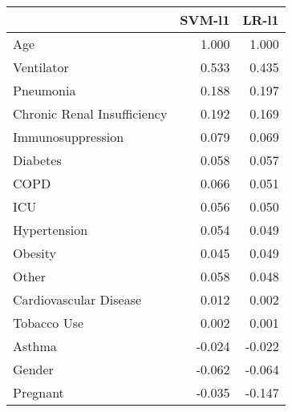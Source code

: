 \begin{tabular}{lrr}
\toprule
{} &  SVM-l1 &  LR-l1 \\
\midrule
Age                         &   1.000 &  1.000 \\
Ventilator                  &   0.533 &  0.435 \\
Pneumonia                   &   0.188 &  0.197 \\
Chronic Renal Insufficiency &   0.192 &  0.169 \\
Immunosuppression           &   0.079 &  0.069 \\
Diabetes                    &   0.058 &  0.057 \\
COPD                        &   0.066 &  0.051 \\
ICU                         &   0.056 &  0.050 \\
Hypertension                &   0.054 &  0.049 \\
Obesity                     &   0.045 &  0.049 \\
Other                       &   0.058 &  0.048 \\
Cardiovascular Disease      &   0.012 &  0.002 \\
Tobacco Use                 &   0.002 &  0.001 \\
Asthma                      &  -0.024 & -0.022 \\
Gender                      &  -0.062 & -0.064 \\
Pregnant                    &  -0.035 & -0.147 \\
\bottomrule
\end{tabular}
